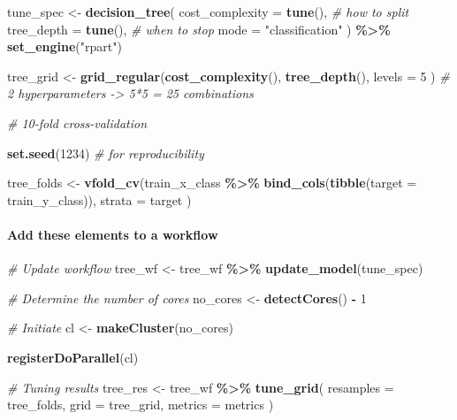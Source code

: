 \documentclass[
]{book}
\newenvironment{Shaded}{\begin{snugshade}}{\end{snugshade}}
\newcommand{\AttributeTok}[1]{\textcolor[rgb]{0.13,0.29,0.53}{#1}}
\newcommand{\CommentTok}[1]{\textcolor[rgb]{0.56,0.35,0.01}{\textit{#1}}}
\newcommand{\DecValTok}[1]{\textcolor[rgb]{0.00,0.00,0.81}{#1}}
\newcommand{\FunctionTok}[1]{\textcolor[rgb]{0.13,0.29,0.53}{\textbf{#1}}}
\newcommand{\NormalTok}[1]{#1}
\newcommand{\OtherTok}[1]{\textcolor[rgb]{0.56,0.35,0.01}{#1}}
\newcommand{\SpecialCharTok}[1]{\textcolor[rgb]{0.81,0.36,0.00}{\textbf{#1}}}
\newcommand{\StringTok}[1]{\textcolor[rgb]{0.31,0.60,0.02}{#1}}
\begin{document}
\begin{Shaded}
\begin{Highlighting}[]
\NormalTok{tune\_spec }\OtherTok{\textless{}{-}} \FunctionTok{decision\_tree}\NormalTok{(}
  \AttributeTok{cost\_complexity =} \FunctionTok{tune}\NormalTok{(), }\CommentTok{\# how to split}
  \AttributeTok{tree\_depth =} \FunctionTok{tune}\NormalTok{(), }\CommentTok{\# when to stop}
  \AttributeTok{mode =} \StringTok{"classification"}
\NormalTok{) }\SpecialCharTok{\%\textgreater{}\%}
  \FunctionTok{set\_engine}\NormalTok{(}\StringTok{"rpart"}\NormalTok{)}

\NormalTok{tree\_grid }\OtherTok{\textless{}{-}} \FunctionTok{grid\_regular}\NormalTok{(}\FunctionTok{cost\_complexity}\NormalTok{(),}
  \FunctionTok{tree\_depth}\NormalTok{(),}
  \AttributeTok{levels =} \DecValTok{5}
\NormalTok{) }\CommentTok{\# 2 hyperparameters {-}\textgreater{} 5*5 = 25 combinations}

\CommentTok{\# 10{-}fold cross{-}validation}

\FunctionTok{set.seed}\NormalTok{(}\DecValTok{1234}\NormalTok{) }\CommentTok{\# for reproducibility}

\NormalTok{tree\_folds }\OtherTok{\textless{}{-}} \FunctionTok{vfold\_cv}\NormalTok{(train\_x\_class }\SpecialCharTok{\%\textgreater{}\%} \FunctionTok{bind\_cols}\NormalTok{(}\FunctionTok{tibble}\NormalTok{(}\AttributeTok{target =}\NormalTok{ train\_y\_class)),}
  \AttributeTok{strata =}\NormalTok{ target}
\NormalTok{)}
\end{Highlighting}
\end{Shaded}

\paragraph{Add these elements to a workflow}\label{add-these-elements-to-a-workflow-1}

\begin{Shaded}
\begin{Highlighting}[]
\CommentTok{\# Update workflow}
\NormalTok{tree\_wf }\OtherTok{\textless{}{-}}\NormalTok{ tree\_wf }\SpecialCharTok{\%\textgreater{}\%} \FunctionTok{update\_model}\NormalTok{(tune\_spec)}

\CommentTok{\# Determine the number of cores}
\NormalTok{no\_cores }\OtherTok{\textless{}{-}} \FunctionTok{detectCores}\NormalTok{() }\SpecialCharTok{{-}} \DecValTok{1}

\CommentTok{\# Initiate}
\NormalTok{cl }\OtherTok{\textless{}{-}} \FunctionTok{makeCluster}\NormalTok{(no\_cores)}

\FunctionTok{registerDoParallel}\NormalTok{(cl)}

\CommentTok{\# Tuning results}
\NormalTok{tree\_res }\OtherTok{\textless{}{-}}\NormalTok{ tree\_wf }\SpecialCharTok{\%\textgreater{}\%}
  \FunctionTok{tune\_grid}\NormalTok{(}
    \AttributeTok{resamples =}\NormalTok{ tree\_folds,}
    \AttributeTok{grid =}\NormalTok{ tree\_grid,}
    \AttributeTok{metrics =}\NormalTok{ metrics}
\NormalTok{  )}
\end{Highlighting}
\end{Shaded}
\end{document}
